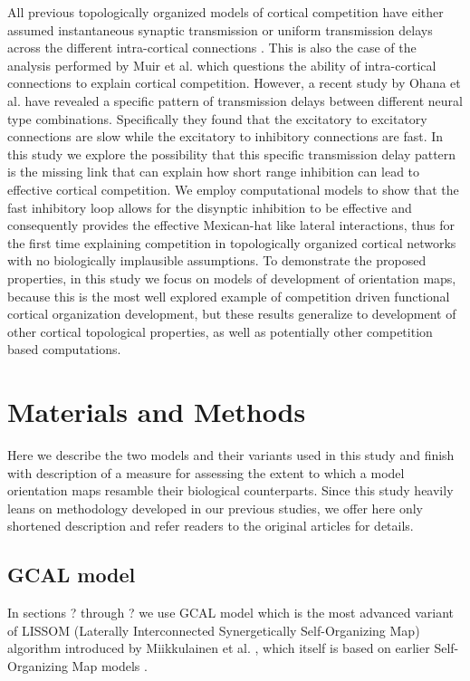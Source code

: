 \documentclass[a4paper,10pt]{article}
\begin{document}
All previous topologically organized models of cortical competition have either assumed instantaneous synaptic transmission \cite{?,?} or uniform transmission delays across the different intra-cortical connections \cite{?,?}. This is also the case of the analysis performed by Muir et al. \cite{Muir2014} which questions the ability of intra-cortical connections to explain cortical competition. However, a recent study by Ohana et al. \cite{Ohana2012} have revealed a specific pattern of transmission delays between different neural type combinations. Specifically they found that the
excitatory to excitatory connections are slow while the excitatory to inhibitory connections are fast. In this study we explore the 
possibility that this specific transmission delay pattern is the missing link that can explain how short range inhibition can lead 
to effective cortical competition. We employ computational models to show that the fast inhibitory loop allows for the disynptic
inhibition to be effective and consequently provides the effective Mexican-hat like lateral interactions, thus for the first time 
explaining competition in topologically organized cortical networks with no biologically implausible assumptions. To demonstrate the
proposed properties, in this study we focus on models of development of orientation maps, because this is the most well explored
example of competition driven functional cortical organization development, but these results generalize to development of other
cortical topological properties, as well as potentially other competition based computations.


\section{Materials and Methods}

Here we describe the two models and their variants used in this study and finish with description of a measure
for assessing the extent to which a model orientation maps resamble their biological counterparts. Since this study heavily leans on methodology 
developed in our previous studies, we offer here only shortened description and refer readers to the original articles for details.

\subsection{GCAL model}

In sections ? through ? we use GCAL model \cite{Stevens2013}  which is the most advanced variant of LISSOM 
(Laterally Interconnected Synergetically Self-Organizing Map) algorithm introduced by Miikkulainen et al. \cite{CMVC}, 
which itself is based on earlier Self-Organizing Map models \cite{Kohonen1982}.
\end{document}
